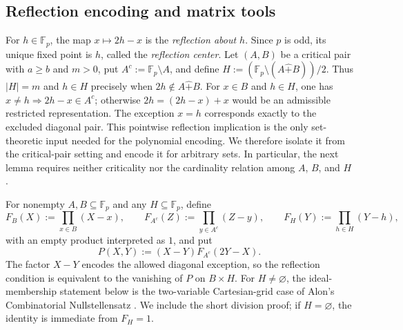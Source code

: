 \documentclass[10pt,a4paper]{amsart}
\newcommand{\F}{\mathbb{F}_p}
\newcommand{\rs}{\mathbin{\widehat+}}
\begin{document}
\subsection{Reflection encoding and matrix tools}\label{reflectionclosure}

For $h\in\F$, the map $x\mapsto2h-x$ is the \emph{reflection about $h$}.
Since $p$ is odd, its unique fixed point is $h$, called the
\emph{reflection center}.
Let $(A,B)$ be a critical pair with $a\ge b$ and $m>0$, put
$A^c:=\F\setminus A$, and define $H:=(\F\setminus(A\rs B))/2$.
Thus $|H|=m$ and $h\in H$ precisely when $2h\notin A\rs B$.
For $x\in B$ and $h\in H$, one has $x\ne h\Rightarrow2h-x\in A^c$;
otherwise $2h=(2h-x)+x$ would be an admissible restricted representation.
The exception $x=h$ corresponds exactly to the excluded diagonal pair.
This pointwise reflection implication is the only set-theoretic input
needed for the polynomial encoding.  We therefore isolate it from the
critical-pair setting and encode it for arbitrary sets.  In particular,
the next lemma requires neither criticality nor the cardinality relation
among $A$, $B$, and $H$.

For nonempty $A,B\subseteq\F$ and any $H\subseteq\F$, define
\begin{equation}\label{rootpolys-set}
 F_B(X):=\prod_{x\in B}(X-x),\qquad
 F_{A^c}(Z):=\prod_{y\in A^c}(Z-y),\qquad
 F_H(Y):=\prod_{h\in H}(Y-h),
\end{equation}
with an empty product interpreted as $1$, and put
\begin{equation}\label{reflectionpoly}
 P(X,Y):=(X-Y)F_{A^c}(2Y-X).
\end{equation}
The factor $X-Y$ encodes the allowed diagonal exception, so the
reflection condition is equivalent to the vanishing of $P$ on $B\times H$.
For $H\ne\varnothing$, the ideal-membership statement below is the
two-variable Cartesian-grid case of Alon's Combinatorial Nullstellensatz
\cite[Theorem 1.1]{AlonCN}.  We include the short division proof; if
$H=\varnothing$, the identity is immediate from $F_H=1$.
\end{document}
